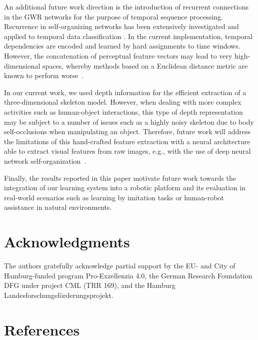 \documentclass[5p,times]{elsarticle}
\begin{document}
An additional future work direction is the introduction of recurrent connections in the GWR networks for the purpose of temporal sequence processing. Recurrence in self-organizing networks has been extensively investigated and applied to temporal data classification \citep{strickert2005merge,PW17}.
In the current implementation, temporal dependencies are encoded and learned by hard assignments to time windows. 
However, the concatenation of perceptual feature vectors may lead to very high-dimensional spaces, whereby methods based on a Euclidean distance metric are known to perform worse~\citep{aggarwal2001surprising}. 

In our current work, we used depth information for the efficient extraction of a three-dimensional skeleton model.
However, when dealing with more complex activities such as human-object interactions, this type of depth representation may be subject to a number of issues such as a highly noisy skeleton due to body self-occlusions when manipulating an object.
Therefore, future work will address the limitations of this hand-crafted feature extraction with a neural architecture able to extract visual features from raw images, e.g., with the use of deep neural network self-organization~\citep{PW17}.

Finally, the results reported in this paper motivate future work towards the integration of our learning system into a robotic platform and its evaluation in real-world scenarios such as learning by imitation tasks or human-robot assistance in natural environments. 

\section*{Acknowledgments}
The authors gratefully acknowledge partial support by the EU- and City of Hamburg-funded program Pro-Exzellenzia 4.0, the German Research Foundation DFG under project CML (TRR 169), and the Hamburg Landesforschungsf{\"o}rderungsprojekt.

\section*{References}


\end{document}
